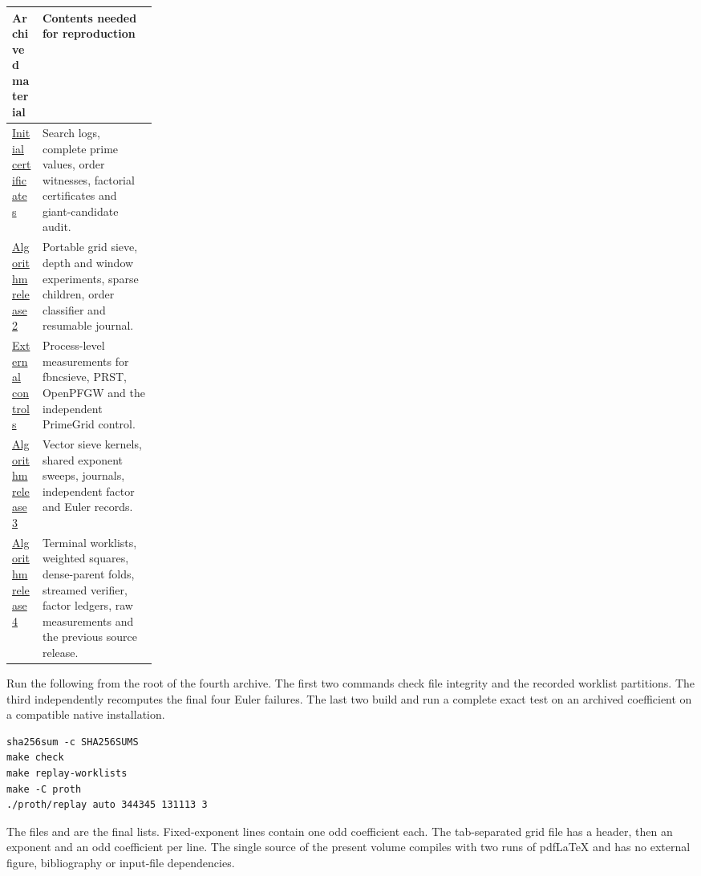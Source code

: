 \documentclass[11pt,a4paper,oneside,openany]{report}
\newcommand{\file}[1]{\texttt{\detokenize{#1}}}
\begin{document}
\begin{center}\small
\begin{tabularx}{\linewidth}{@{}p{0.21\linewidth}X@{}}\toprule
Archived material & Contents needed for reproduction\\\midrule
\href{https://chatgpt.com/library?file_id=libfile_fde3_f-9a13d05e4ae481919597a7b7132f8e80_67c74a3277a88191acd4edb2733e13fb\&account_id=personal}{Initial certificates} & Search logs, complete prime values, order witnesses, factorial certificates and giant-candidate audit.\\
\href{https://chatgpt.com/library?file_id=libfile_fde3_f-bbe6f17ab17c81918b98d6d77ae7636a_67c74a3277a88191acd4edb2733e13fb\&account_id=personal}{Algorithm release 2} & Portable grid sieve, depth and window experiments, sparse children, order classifier and resumable journal.\\
\href{https://chatgpt.com/library?file_id=libfile_fde3_f-84e200c243988191a22d89850768a0b0_67c74a3277a88191acd4edb2733e13fb\&account_id=personal}{External controls} & Process-level measurements for fbncsieve, PRST, OpenPFGW and the independent PrimeGrid control.\\
\href{https://chatgpt.com/library?file_id=libfile_fde3_f-012e526deac081918eb3e2a95df51b90_67c74a3277a88191acd4edb2733e13fb\&account_id=personal}{Algorithm release 3} & Vector sieve kernels, shared exponent sweeps, journals, independent factor and Euler records.\\
\href{https://chatgpt.com/library?file_id=libfile_fde3_f-ad2224a5814c8191b48c3ebbd298e3b4_67c74a3277a88191acd4edb2733e13fb\&account_id=personal}{Algorithm release 4} & Terminal worklists, weighted squares, dense-parent folds, streamed verifier, factor ledgers, raw measurements and the previous source release.\\\bottomrule
\end{tabularx}
\end{center}
\begin{samepage}
Run the following from the root of the fourth archive. The first two commands check file integrity and the recorded worklist partitions. The third independently recomputes the final four Euler failures. The last two build and run a complete exact test on an archived coefficient on a compatible native installation.
{\small\begin{verbatim}
sha256sum -c SHA256SUMS
make check
make replay-worklists
make -C proth
./proth/replay auto 344345 131113 3
\end{verbatim}}
\end{samepage}
The files \file{data/fixed_remaining.txt} and \file{data/Q_remaining.tsv} are the final lists. Fixed-exponent lines contain one odd coefficient each. The tab-separated grid file has a header, then an exponent and an odd coefficient per line. The single source of the present volume compiles with two runs of pdfLaTeX and has no external figure, bibliography or input-file dependencies.
\end{document}
